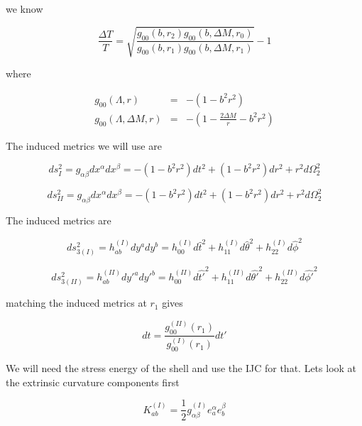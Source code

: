 \documentclass[aps,showpacs,onecolumn,floats,prd,superscriptaddress,nofootinbib]{revtex4-1}
\begin{document}
we know

\begin{equation}
	\frac{\Delta T}{T} = \sqrt{\frac{g_{00}(b, r_2) g_{00}(b, \Delta M, r_0)}{g_{00}(b, r_1) g_{00}(b, \Delta M, r_1)}} -1
\end{equation}

where

\begin{eqnarray}
	g_{00}(\Lambda, r) & = & - \left( 1 - b^2 r^2 \right)	\nonumber	\\
	g_{00}(\Lambda, \Delta M, r) & = & - \left( 1 - \frac{2 \Delta M}{r} - b^2 r^2 \right)
\end{eqnarray}

The induced metrics we will use are

\begin{equation}
	ds^2_I = g_{\alpha \beta} dx^\alpha dx^\beta  =-( 1 - b^2 r^2) dt^2 + (1 - b^2 r^2 ) dr^2 + r^2 d \Omega^2_2 
\end{equation}

\begin{equation}
	ds^2_{II} = g_{\alpha \beta} dx^\alpha dx^\beta  =- ( 1 - b^2 r^2) dt^2 + (1 - b^2 r^2 ) dr^2 + r^2 d \Omega^2_2 
\end{equation}

The induced metrics are

\begin{equation}
	ds^2_{3(I)} = h_{ab}^{(I)} dy^a dy^b = h_{00}^{(I)} d \hat{t}^2 + h_{11}^{(I)} d \hat{\theta}^2 + h^{(I)}_{22} d \hat{\phi}^2
\end{equation}

\begin{equation}
	ds^2_{3(II)} = h_{ab}^{(II)} dy'^a dy'^b = h_{00}^{(II)} d \hat{t'}^2 + h_{11}^{(II)} d \hat{\theta '}^2 + h^{(II)}_{22} d \hat{\phi '}^2
\end{equation}

matching the induced metrics at $r_1$ gives

\begin{equation}
	dt = \frac{g_{00}^{(II)}(r_1)}{g_{00}^{(I)}(r_1)} dt'
\end{equation}

We will need the stress energy of the shell and use the IJC for that. Lets look at the extrinsic curvature components first

\begin{equation}
	K^{(I)}_{ab} = \frac{1}{2} g^{(I)}_{\alpha \beta} e^\alpha_a e^\beta_b
\end{equation}
\end{document}
